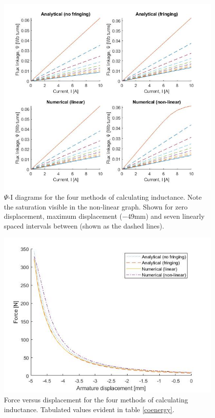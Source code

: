 \documentclass[a4paper]{IEEEtran}
\begin{document}
\begin{figure}[ht]
\includegraphics[width = \linewidth]{psi-I-diagrams.jpg}
\caption{$\Psi$-I diagrams for the four methods of calculating inductance. Note the saturation visible in the non-linear graph. Shown for zero displacement, maximum displacement ($-49$mm) and seven linearly spaced intervals between (shown as the dashed lines).}
\label{psi-eye} 
\end{figure}

\begin{figure}[ht]
\includegraphics[width = \linewidth]{Force-Displacement.jpg}
\caption{Force versus displacement for the four methods of calculating inductance. Tabulated values evident in table \ref{coenergy}.}
\label{forceGraph} 
\end{figure}
\end{document}
